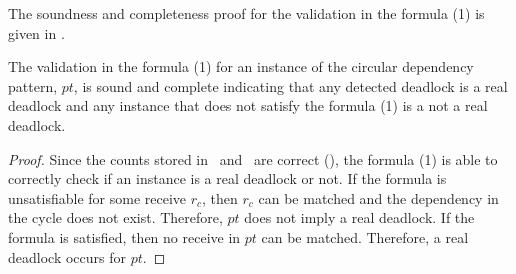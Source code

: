 The soundness and completeness proof for the validation in the formula (1) is given in .

\begin{lemma}
The validation in the formula (1) for an instance of the circular dependency pattern, $\mathit{pt}$, is sound and complete indicating that any detected deadlock is a real deadlock and any instance that does not satisfy the formula (1) is a not a real deadlock. 
\label{lemma:circular}
\end{lemma}
\begin{proof}
Since the counts stored in \epsnd\ and \eprcv\ are correct (), the formula (1) is able to correctly check if an instance is a real deadlock or not. If the formula is unsatisfiable for some receive $r_c$, then $r_c$ can be matched and the dependency in the cycle does not exist. Therefore, $\mathit{pt}$ does not imply a real deadlock. If the formula is satisfied, then no receive in $\mathit{pt}$ can be matched. Therefore, a real deadlock occurs for $\mathit{pt}$.
\end{proof} 





